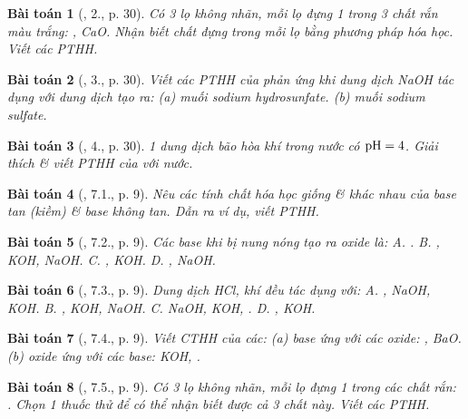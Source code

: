 \documentclass{article}
\newtheorem{baitoan}{Bài toán}
\begin{document}
\begin{baitoan}[\cite{SGK_Hoa_Hoc_9}, 2., p. 30]
	Có 3 lọ không nhãn, mỗi lọ đựng 1 trong 3 chất rắn màu trắng: \emph{, CaO}. Nhận biết chất đựng trong mỗi lọ bằng phương pháp hóa học. Viết các PTHH.
\end{baitoan}

\begin{baitoan}[\cite{SGK_Hoa_Hoc_9}, 3., p. 30]
	Viết các PTHH của phản ứng khi dung dịch \emph{NaOH} tác dụng với dung dịch \emph{} tạo ra: (a) muối sodium hydrosunfate. (b) muối sodium sulfate.
\end{baitoan}

\begin{baitoan}[\cite{SGK_Hoa_Hoc_9}, 4., p. 30]
	1 dung dịch bão hòa khí \emph{} trong nước có $\rm pH = 4$. Giải thích \& viết PTHH của \emph{} với nước.
\end{baitoan}

\begin{baitoan}[\cite{SGK_Hoa_Hoc_9}, 7.1., p. 9]
	Nêu các tính chất hóa học giống \& khác nhau của base tan (kiềm) \& base không tan. Dẫn ra ví dụ, viết PTHH.
\end{baitoan}

\begin{baitoan}[\cite{SGK_Hoa_Hoc_9}, 7.2., p. 9]
	Các base khi bị nung nóng tạo ra oxide là: {\sf A.} \emph{}. {\sf B.} \emph{, KOH, NaOH}. {\sf C.} \emph{, KOH}. {\sf D.} \emph{, NaOH}.
\end{baitoan}

\begin{baitoan}[\cite{SGK_Hoa_Hoc_9}, 7.3., p. 9]
	Dung dịch \emph{HCl}, khí \emph{} đều tác dụng với: {\sf A.} \emph{, NaOH, KOH}. {\sf B.} \emph{, KOH, NaOH}. {\sf C.} \emph{NaOH, KOH, }. {\sf D.} \emph{, KOH}.
\end{baitoan}

\begin{baitoan}[\cite{SGK_Hoa_Hoc_9}, 7.4., p. 9]
	Viết CTHH của các: (a) base ứng với các oxide: \emph{, BaO}. (b) oxide ứng với các base: \emph{KOH, }.
\end{baitoan}

\begin{baitoan}[\cite{SGK_Hoa_Hoc_9}, 7.5., p. 9]
	Có 3 lọ không nhãn, mỗi lọ đựng 1 trong các chất rắn: \emph{}. Chọn 1 thuốc thử để có thể nhận biết được cả 3 chất này. Viết các PTHH.
\end{baitoan}
\end{document}
